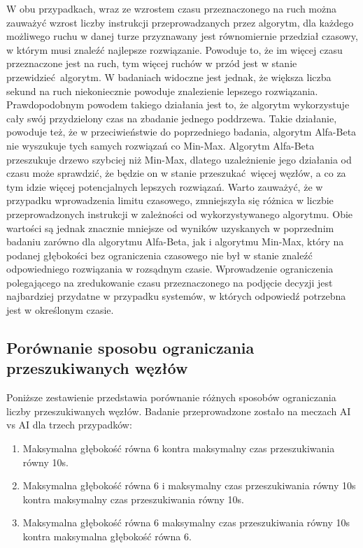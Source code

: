 \documentclass[a4paper,10pt]{article}
\begin{document}
    \newpage
    \justify
    W obu przypadkach, wraz ze wzrostem czasu przeznaczonego na ruch można zauważyć wzrost liczby instrukcji przeprowadzanych przez algorytm, dla każdego możliwego ruchu w danej turze przyznawany jest równomiernie przedział czasowy, w którym musi znaleźć najlepsze rozwiązanie. Powoduje to, że im więcej czasu przeznaczone jest na ruch, tym więcej ruchów w przód jest w stanie przewidzieć algorytm. W badaniach widoczne jest jednak, że większa liczba sekund na ruch niekoniecznie powoduje znalezienie lepszego rozwiązania. Prawdopodobnym powodem takiego działania jest to, że algorytm wykorzystuje cały swój przydzielony czas na zbadanie jednego poddrzewa. Takie działanie, powoduje też, że w przeciwieństwie do poprzedniego badania, algorytm Alfa-Beta nie wyszukuje tych samych rozwiązań co Min-Max. Algorytm Alfa-Beta przeszukuje drzewo szybciej niż Min-Max, dlatego uzależnienie jego działania od czasu może sprawdzić, że będzie on w stanie przeszukać więcej węzłów, a co za tym idzie więcej potencjalnych lepszych rozwiązań.
    Warto zauważyć, że w przypadku wprowadzenia limitu czasowego, zmniejszyła się różnica w liczbie przeprowadzonych instrukcji w zależności od wykorzystywanego algorytmu. Obie wartości są jednak znacznie mniejsze od wyników uzyskanych w poprzednim badaniu zarówno dla algorytmu Alfa-Beta, jak i algorytmu Min-Max, który na podanej głębokości bez ograniczenia czasowego nie był w stanie znaleźć odpowiedniego rozwiązania w rozsądnym czasie.
    Wprowadzenie ograniczenia polegającego na zredukowanie czasu przeznaczonego na podjęcie decyzji jest najbardziej przydatne w przypadku systemów, w których odpowiedź potrzebna jest w określonym czasie.
    
    \subsection{Porównanie sposobu ograniczania przeszukiwanych węzłów}
    Poniższe zestawienie przedstawia porównanie różnych sposobów ograniczania liczby przeszukiwanych węzłów. Badanie przeprowadzone zostało na meczach AI vs AI dla trzech przypadków:
    
    \begin{enumerate}
    \item{Maksymalna głębokość równa 6 kontra maksymalny czas przeszukiwania równy 10s.}
    \item{Maksymalna głębokość równa 6 i maksymalny czas przeszukiwania równy 10s kontra maksymalny czas przeszukiwania równy 10s.}
    \item{Maksymalna głębokość równa 6 maksymalny czas przeszukiwania równy 10s kontra maksymalna głębokość równa 6.}
    \end{enumerate}
    
\end{document}
